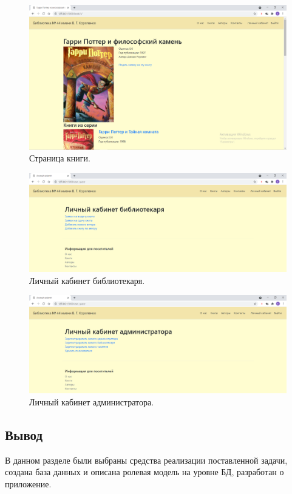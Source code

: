 \begin{figure}[h!]
	\centering
	\includegraphics[scale=0.4]{img/Interface6.png}
	\caption{Страница книги.}
\end{figure}

\begin{figure}[h!]
	\centering
	\includegraphics[scale=0.4]{img/Interface7.png}
	\caption{Личный кабинет библиотекаря.}
\end{figure}

\begin{figure}[h!]
	\centering
	\includegraphics[scale=0.4]{img/Interface8.png}
	\caption{Личный кабинет администратора.}
\end{figure}
\clearpage

\subsection{Вывод}
В данном разделе были выбраны средства реализации поставленной задачи, создана база данных и описана ролевая модель на уровне БД, разработан о приложение.
\newpage

